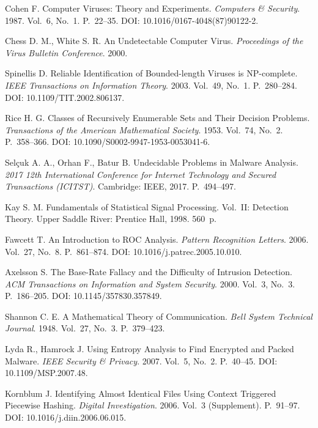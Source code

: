 
 Cohen F. Computer Viruses: Theory and Experiments. \emph{Computers \& Security}. 1987. Vol.~6, No.~1. P.~22--35. DOI: 10.1016/0167-4048(87)90122-2.

 Chess D. M., White S. R. An Undetectable Computer Virus. \emph{Proceedings of the Virus Bulletin Conference}. 2000.

 Spinellis D. Reliable Identification of Bounded-length Viruses is NP-complete. \emph{IEEE Transactions on Information Theory}. 2003. Vol.~49, No.~1. P.~280--284. DOI: 10.1109/TIT.2002.806137.

 Rice H. G. Classes of Recursively Enumerable Sets and Their Decision Problems. \emph{Transactions of the American Mathematical Society}. 1953. Vol.~74, No.~2. P.~358--366. DOI: 10.1090/S0002-9947-1953-0053041-6.

 Selçuk A. A., Orhan F., Batur B. Undecidable Problems in Malware Analysis. \emph{2017 12th International Conference for Internet Technology and Secured Transactions (ICITST)}. Cambridge: IEEE, 2017. P.~494--497.

 Kay S. M. Fundamentals of Statistical Signal Processing. Vol.~II: Detection Theory. Upper Saddle River: Prentice Hall, 1998. 560~p.

 Fawcett T. An Introduction to ROC Analysis. \emph{Pattern Recognition Letters}. 2006. Vol.~27, No.~8. P.~861--874. DOI: 10.1016/j.patrec.2005.10.010.

 Axelsson S. The Base-Rate Fallacy and the Difficulty of Intrusion Detection. \emph{ACM Transactions on Information and System Security}. 2000. Vol.~3, No.~3. P.~186--205. DOI: 10.1145/357830.357849.

 Shannon C. E. A Mathematical Theory of Communication. \emph{Bell System Technical Journal}. 1948. Vol.~27, No.~3. P.~379--423.

 Lyda R., Hamrock J. Using Entropy Analysis to Find Encrypted and Packed Malware. \emph{IEEE Security \& Privacy}. 2007. Vol.~5, No.~2. P.~40--45. DOI: 10.1109/MSP.2007.48.

 Kornblum J. Identifying Almost Identical Files Using Context Triggered Piecewise Hashing. \emph{Digital Investigation}. 2006. Vol.~3 (Supplement). P.~91--97. DOI: 10.1016/j.diin.2006.06.015.

